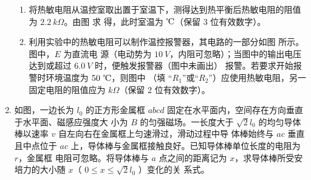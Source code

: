 \begin{enumerate}
\begin{enumerate}
\item 
将热敏电阻从温控室取出置于室温下，测得达到热平衡后热敏电阻的阻值为 $ 2.2 \ k\Omega $。由图  求
得，此时室温为 \underlinegap $ \celsius $（保留 $ 3 $ 位有效数字）。
\item 
利用实验中的热敏电阻可以制作温控报警器，其电路的一部分如图  所示。图中，$ E $ 为直流电
源（电动势为 $ 10 \ V $，内阻可忽略）；当图中的输出电压达到或超过 $ 6.0 \ V $ 时，便触发报警器（图中未画出）
报警。若要求开始报警时环境温度为 $ 50 \ \celsius $，则图中 \underlinegap （填
“$ R_{1} $”或“$ R_{2} $”）应使用热敏电阻，另一固定电阻的阻值应为 \underlinegap $ k \Omega $（保留 $ 2 $ 位有效数字）。

\end{enumerate}







\newpage
\item
如图，一边长为 $ l_{0} $ 的正方形金属框 $ abcd $ 固定在水平面内，空间存在方向垂直于水平面、磁感应强度大
小为 $ B $ 的匀强磁场。一长度大于 $ \sqrt{2}l_{0} $ 的均匀导体棒以速率 $ v $ 自左向右在金属框上匀速滑过，滑动过程中导
体棒始终与 $ ac $ 垂直且中点位于 $ ac $ 上，导体棒与金属框接触良好。已知导体棒单位长度的电阻为 $ r $，金属框
电阻可忽略。将导体棒与 $ a $ 点之间的距离记为 $ x $，求导体棒所受安培力的大小随 $ x $（ $ 0 \leq x \leq \sqrt{2}l_{0} $ ）变化的关
系式。
\begin{figure}[h!]
\flushright

\end{figure}


\end{enumerate}
